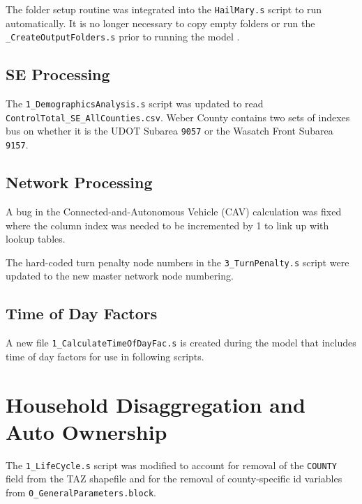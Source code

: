 \documentclass[
  letterpaper,
  DIV=11,
  numbers=noendperiod]{scrreprt}
\begin{document}
The folder setup routine was integrated into the \texttt{HailMary.s}
script to run automatically. It is no longer necessary to copy empty
folders or run the \texttt{\_CreateOutputFolders.s} prior to running the
model .

\hypertarget{se-processing}{%
\section{SE Processing}\label{se-processing}}

The \texttt{1\_DemographicsAnalysis.s} script was updated to read \\
\texttt{ControlTotal\_SE\_AllCounties.csv}. Weber County contains two
sets of indexes bus on whether it is the UDOT Subarea \texttt{9057} or
the Wasatch Front Subarea \texttt{9157}.

\hypertarget{network-processing}{%
\section{Network Processing}\label{network-processing}}

A bug in the Connected-and-Autonomous Vehicle (CAV) calculation was
fixed where the column index was needed to be incremented by 1 to link
up with lookup tables.

The hard-coded turn penalty node numbers in the
\texttt{3\_TurnPenalty.s} script were updated to the new master network
node numbering.

\hypertarget{time-of-day-factors}{%
\section{Time of Day Factors}\label{time-of-day-factors}}

A new file \texttt{1\_CalculateTimeOfDayFac.s} is created during the
model that includes time of day factors for use in following scripts.


\hypertarget{household-disaggregation-and-auto-ownership-1}{%
\chapter{Household Disaggregation and Auto
Ownership}\label{household-disaggregation-and-auto-ownership-1}}

The \texttt{1\_LifeCycle.s} script was modified to account for removal
of the \texttt{COUNTY} field from the TAZ shapefile and for the removal
of county-specific id variables from
\texttt{0\_GeneralParameters.block}.
\end{document}

